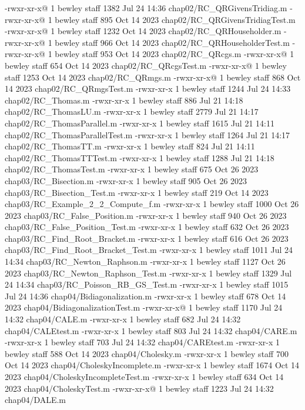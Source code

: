 -rwxr-xr-x@ 1 bewley  staff   1382 Jul 24 14:36 chap02/RC_QRGivensTridiag.m
-rwxr-xr-x@ 1 bewley  staff    895 Oct 14  2023 chap02/RC_QRGivensTridiagTest.m
-rwxr-xr-x@ 1 bewley  staff   1232 Oct 14  2023 chap02/RC_QRHouseholder.m
-rwxr-xr-x@ 1 bewley  staff    966 Oct 14  2023 chap02/RC_QRHouseholderTest.m
-rwxr-xr-x@ 1 bewley  staff    953 Oct 14  2023 chap02/RC_QRcgs.m
-rwxr-xr-x@ 1 bewley  staff    654 Oct 14  2023 chap02/RC_QRcgsTest.m
-rwxr-xr-x@ 1 bewley  staff   1253 Oct 14  2023 chap02/RC_QRmgs.m
-rwxr-xr-x@ 1 bewley  staff    868 Oct 14  2023 chap02/RC_QRmgsTest.m
-rwxr-xr-x  1 bewley  staff   1244 Jul 24 14:33 chap02/RC_Thomas.m
-rwxr-xr-x  1 bewley  staff    886 Jul 21 14:18 chap02/RC_ThomasLU.m
-rwxr-xr-x  1 bewley  staff   2779 Jul 21 14:17 chap02/RC_ThomasParallel.m
-rwxr-xr-x  1 bewley  staff   1615 Jul 21 14:11 chap02/RC_ThomasParallelTest.m
-rwxr-xr-x  1 bewley  staff   1264 Jul 21 14:17 chap02/RC_ThomasTT.m
-rwxr-xr-x  1 bewley  staff    824 Jul 21 14:11 chap02/RC_ThomasTTTest.m
-rwxr-xr-x  1 bewley  staff   1288 Jul 21 14:18 chap02/RC_ThomasTest.m
-rwxr-xr-x  1 bewley  staff    675 Oct 26  2023 chap03/RC_Bisection.m
-rwxr-xr-x  1 bewley  staff    905 Oct 26  2023 chap03/RC_Bisection_Test.m
-rwxr-xr-x  1 bewley  staff    219 Oct 14  2023 chap03/RC_Example_2_2_Compute_f.m
-rwxr-xr-x  1 bewley  staff   1000 Oct 26  2023 chap03/RC_False_Position.m
-rwxr-xr-x  1 bewley  staff    940 Oct 26  2023 chap03/RC_False_Position_Test.m
-rwxr-xr-x  1 bewley  staff    632 Oct 26  2023 chap03/RC_Find_Root_Bracket.m
-rwxr-xr-x  1 bewley  staff    616 Oct 26  2023 chap03/RC_Find_Root_Bracket_Test.m
-rwxr-xr-x  1 bewley  staff   1011 Jul 24 14:34 chap03/RC_Newton_Raphson.m
-rwxr-xr-x  1 bewley  staff   1127 Oct 26  2023 chap03/RC_Newton_Raphson_Test.m
-rwxr-xr-x  1 bewley  staff   1329 Jul 24 14:34 chap03/RC_Poisson_RB_GS_Test.m
-rwxr-xr-x  1 bewley  staff   1015 Jul 24 14:36 chap04/Bidiagonalization.m
-rwxr-xr-x  1 bewley  staff    678 Oct 14  2023 chap04/BidiagonalizationTest.m
-rwxr-xr-x@ 1 bewley  staff   1170 Jul 24 14:32 chap04/CALE.m
-rwxr-xr-x  1 bewley  staff    682 Jul 24 14:32 chap04/CALEtest.m
-rwxr-xr-x  1 bewley  staff    803 Jul 24 14:32 chap04/CARE.m
-rwxr-xr-x  1 bewley  staff    703 Jul 24 14:32 chap04/CAREtest.m
-rwxr-xr-x  1 bewley  staff    588 Oct 14  2023 chap04/Cholesky.m
-rwxr-xr-x  1 bewley  staff    700 Oct 14  2023 chap04/CholeskyIncomplete.m
-rwxr-xr-x  1 bewley  staff   1674 Oct 14  2023 chap04/CholeskyIncompleteTest.m
-rwxr-xr-x  1 bewley  staff    634 Oct 14  2023 chap04/CholeskyTest.m
-rwxr-xr-x@ 1 bewley  staff   1223 Jul 24 14:32 chap04/DALE.m
